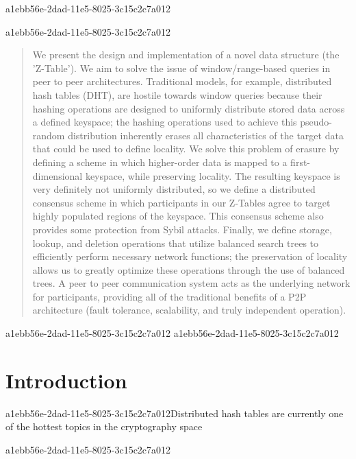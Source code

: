 \documentclass[12pt]{article}
\begin{document}
a1ebb56e-2dad-11e5-8025-3c15c2c7a012\maketitle

a1ebb56e-2dad-11e5-8025-3c15c2c7a012\begin{abstract}
We present the design and implementation of a novel data structure (the 'Z-Table'). We aim to solve the issue of window/range-based queries in peer to peer architectures. Traditional models, for example,  distributed hash tables (DHT), are hostile towards window queries because their hashing operations are designed to uniformly distribute stored data across a defined keyspace; the hashing operations used to achieve this pseudo-random distribution inherently erases all characteristics of the target data that could be used to define locality. We solve this problem of erasure by defining a scheme in which higher-order data is mapped to a first-dimensional keyspace, while preserving locality. The resulting keyspace is very definitely not uniformly distributed, so we define a distributed consensus scheme in which participants in our Z-Tables agree to target highly populated regions of the keyspace. This consensus scheme also provides some protection from Sybil attacks. Finally, we define storage, lookup, and deletion operations that utilize balanced search trees to efficiently perform necessary network functions; the preservation of locality allows us to greatly optimize these operations through the use of balanced trees. A peer to peer communication system acts as the underlying network for participants, providing all of the traditional benefits of a P2P architecture (fault tolerance, scalability, and truly independent operation).
\end{abstract}

a1ebb56e-2dad-11e5-8025-3c15c2c7a012
\newpage
a1ebb56e-2dad-11e5-8025-3c15c2c7a012\section{Introduction}
a1ebb56e-2dad-11e5-8025-3c15c2c7a012Distributed hash tables are currently one of the hottest topics in the cryptography space~\cite{Stoica:2001dj,Rowstron:2001ea,Ratnasamy:2001wn}

\printbibliography
a1ebb56e-2dad-11e5-8025-3c15c2c7a012
\end{document}

